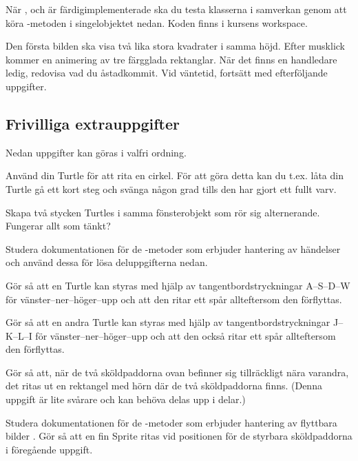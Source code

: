 \clearpage

\Task\Checkpoint När ,  och  är färdigimplementerade ska du testa klasserna i samverkan genom att köra -metoden i singelobjektet  nedan. Koden finns i kursens workspace.

Den första bilden ska visa två lika stora kvadrater i samma höjd. Efter musklick kommer en animering av tre färgglada rektanglar. När det finns en handledare ledig, redovisa vad du åstadkommit. Vid väntetid, fortsätt med efterföljande uppgifter.



\clearpage

\subsection{Frivilliga extrauppgifter}

Nedan uppgifter kan göras i valfri ordning.

\Task Använd din Turtle för att rita en cirkel. För att göra detta kan du t.ex. låta din Turtle gå ett kort steg och svänga någon grad tills den har gjort ett fullt varv.

\Task Skapa två stycken Turtles i samma fönsterobjekt som rör sig alternerande. Fungerar allt som tänkt?


\Task Studera dokumentationen för de -metoder som erbjuder hantering av händelser  och använd dessa för lösa deluppgifterna nedan.

\Subtask Gör så att en Turtle kan styras med hjälp av tangentbordstryckningar A--S--D--W för vänster--ner--höger--upp och att den ritar ett spår allteftersom den förflyttas.

\Subtask Gör så att en andra Turtle kan styras med hjälp av tangentbordstryckningar J--K--L--I för vänster--ner--höger--upp och att den också ritar ett spår allteftersom den förflyttas.

\Subtask Gör så att, när de två sköldpaddorna ovan befinner sig tillräckligt nära varandra, det ritas ut en rektangel med hörn där de två sköldpaddorna finns. (Denna uppgift är lite svårare och kan behöva delas upp i delar.)


\Task Studera dokumentationen för de -metoder som erbjuder hantering av flyttbara bilder . Gör så att en fin Sprite ritas vid positionen för de styrbara sköldpaddorna i föregående uppgift.



